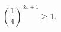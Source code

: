 \begin{ex}[type=inequality]
	\begin{condition}
		$ \left(\dfrac{1}{4}\right)^{3x + 1}\geqslant1.$
	\end{condition}
\end{ex}